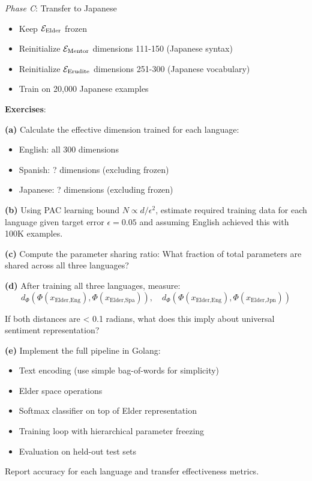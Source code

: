 \begin{application}
\textit{Phase C}: Transfer to Japanese
\begin{itemize}
\item Keep $\mathcal{E}_{\text{Elder}}$ frozen
\item Reinitialize $\mathcal{E}_{\text{Mentor}}$ dimensions 111-150 (Japanese syntax)
\item Reinitialize $\mathcal{E}_{\text{Erudite}}$ dimensions 251-300 (Japanese vocabulary)
\item Train on 20,000 Japanese examples
\end{itemize}

\textbf{Exercises}:

\textbf{(a)} Calculate the effective dimension trained for each language:
\begin{itemize}
\item English: all 300 dimensions
\item Spanish: ? dimensions (excluding frozen)
\item Japanese: ? dimensions (excluding frozen)
\end{itemize}

\textbf{(b)} Using PAC learning bound $N \propto d/\epsilon^2$, estimate required training data for each language given target error $\epsilon = 0.05$ and assuming English achieved this with 100K examples.

\textbf{(c)} Compute the parameter sharing ratio: What fraction of total parameters are shared across all three languages?

\textbf{(d)} After training all three languages, measure:
$$d_{\Phi}(\Phi(x_{\text{Elder,Eng}}), \Phi(x_{\text{Elder,Spa}})), \quad d_{\Phi}(\Phi(x_{\text{Elder,Eng}}), \Phi(x_{\text{Elder,Jpn}}))$$

If both distances are < 0.1 radians, what does this imply about universal sentiment representation?

\textbf{(e)} Implement the full pipeline in Golang:
\begin{itemize}
\item Text encoding (use simple bag-of-words for simplicity)
\item Elder space operations
\item Softmax classifier on top of Elder representation
\item Training loop with hierarchical parameter freezing
\item Evaluation on held-out test sets
\end{itemize}

Report accuracy for each language and transfer effectiveness metrics.
\end{application}

